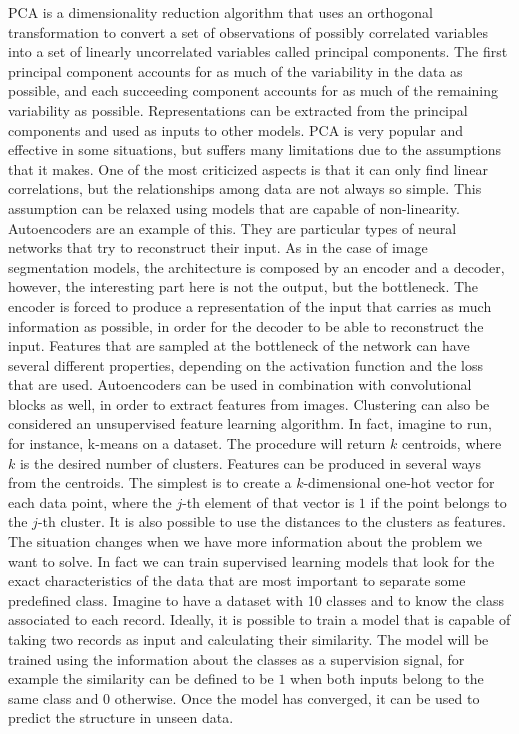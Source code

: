\noindent PCA is a dimensionality reduction algorithm that uses an orthogonal transformation to convert a set of observations of possibly correlated variables into a set of linearly uncorrelated variables called principal components. The first principal component accounts for as much of the variability in the data as possible, and each succeeding component accounts for as much of the remaining variability as possible. Representations can be extracted from the principal components and used as inputs to other models. PCA is very popular and effective in some situations, but suffers many limitations due to the assumptions that it makes. One of the most criticized aspects is that it can only find linear correlations, but the relationships among data are not always so simple. This assumption can be relaxed using models that are capable of non-linearity. Autoencoders are an example of this. They are particular types of neural networks that try to reconstruct their input. As in the case of image segmentation models, the architecture is composed by an encoder and a decoder, however, the interesting part here is not the output, but the bottleneck. The encoder is forced to produce a representation of the input that carries as much information as possible, in order for the decoder to be able to reconstruct the input. Features that are sampled at the bottleneck of the network can have several different properties, depending on the activation function and the loss that are used. Autoencoders can be used in combination with convolutional blocks as well, in order to extract features from images.
\bigbreak
\noindent Clustering can also be considered an unsupervised feature learning algorithm. In fact, imagine to run, for instance, k-means on a dataset. The procedure will return $k$ centroids, where $k$ is the desired number of clusters. Features can be produced in several ways from the centroids. The simplest is to create a $k$-dimensional one-hot vector for each data point, where the $j$-th element of that vector is $1$ if the point belongs to the $j$-th cluster. It is also possible to use the distances to the clusters as features.
\bigbreak
\noindent The situation changes when we have more information about the problem we want to solve. In fact we can train supervised learning models that look for the exact characteristics of the data that are most important to separate some predefined class. Imagine to have a dataset with 10 classes and to know the class associated to each record. Ideally, it is possible to train a model that is capable of taking two records as input and calculating their similarity. The model will be trained using the information about the classes as a supervision signal, for example the similarity can be defined to be $1$ when both inputs belong to the same class and $0$ otherwise. Once the model has converged, it can be used to predict the structure in unseen data.
